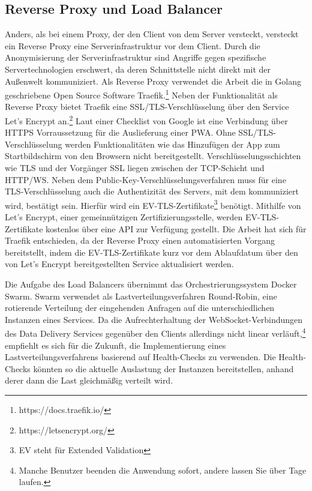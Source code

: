 \subsection{Reverse Proxy und Load Balancer}
\label{subsec:reverseproxyundloadbalancer}
Anders, als bei einem Proxy, der den Client von dem Server versteckt, versteckt ein Reverse Proxy
eine Serverinfrastruktur vor dem Client. Durch die Anonymisierung der Serverinfrastruktur
sind Angriffe gegen spezifische Servertechnologien erschwert, da deren Schnittstelle
nicht direkt mit der Außenwelt kommuniziert. Als Reverse Proxy verwendet die Arbeit
die in Golang geschriebene Open Source Software Traefik.\footnote{https://docs.traefik.io/}
Neben der Funktionalität als Reverse Proxy bietet Traefik eine
SSL/TLS-Verschlüsselung über den Service Let's Encrypt an.\footnote{https://letsencrypt.org/}
Laut einer Checklist von Google ist eine Verbindung über HTTPS
Vorraussetzung für die Auslieferung einer PWA.\cite{GooglePWAChecklist}
Ohne SSL/TLS-Verschlüsselung werden Funktionalitäten wie das Hinzufügen der App zum Startbildschirm
von den Browsern nicht bereitgestellt. Verschlüsselungsschichten wie TLS und der Vorgänger
SSL liegen zwischen der TCP-Schicht und HTTP/WS. Neben dem Public-Key-Verschlüsselungsverfahren
muss für eine TLS-Verschlüsselung auch die Authentizität des Servers, mit dem kommuniziert wird,
bestätigt sein. Hierfür wird ein EV-TLS-Zertifikate\footnote{EV steht für Extended Validation} benötigt.
Mithilfe von Let's Encrypt, einer gemeinnützigen Zertifizierungsstelle, werden EV-TLS-Zertifikate
kostenlos über eine API zur Verfügung gestellt. Die Arbeit hat sich für Traefik entschieden,
da der Reverse Proxy einen automatisierten Vorgang bereitstellt, indem die EV-TLS-Zertifikate
kurz vor dem Ablaufdatum über den von Let's Encrypt bereitgestellten Service aktualisiert werden.

Die Aufgabe des Load Balancers übernimmt das Orchestrierungssystem Docker Swarm. Swarm verwendet
als Lastverteilungsverfahren Round-Robin, eine rotierende Verteilung der eingehenden Anfragen auf
die unterschiedlichen Instanzen eines Services.\cite{CloudflareRoundRobinDNS}
Da die Aufrechterhaltung der WebSocket-Verbindungen des Data Delivery Services gegenüber
den Clients allerdings nicht linear verläuft,\footnote{Manche Benutzer beenden die Anwendung sofort, andere lassen Sie über Tage laufen.}
empfiehlt es sich für die Zukunft, die Implementierung eines Lastverteilungsverfahrens
basierend auf Health-Checks zu verwenden. Die Health-Checks könnten so die aktuelle
Auslastung der Instanzen bereitstellen, anhand derer dann die Last gleichmäßig verteilt wird.

